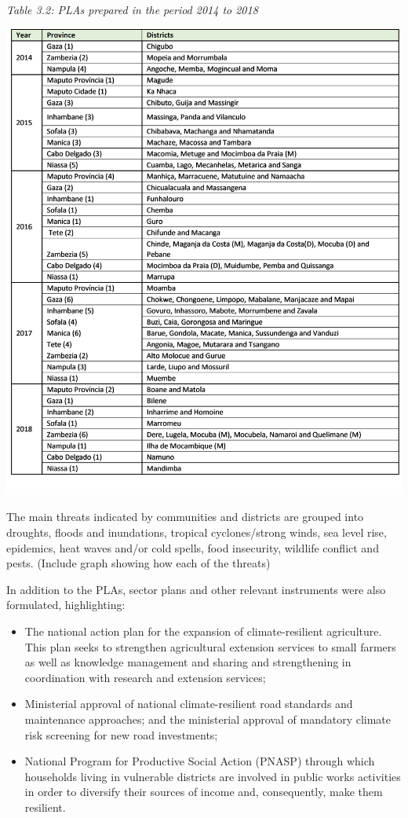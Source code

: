 \documentclass[
]{book}
\begin{document}
\emph{Table 3.2: PLAs prepared in the period 2014 to 2018}

\includegraphics{Figure25.png}

The main threats indicated by communities and districts are grouped into droughts, floods and inundations, tropical cyclones/strong winds, sea level rise, epidemics, heat waves and/or cold spells, food insecurity, wildlife conflict and pests. (Include graph showing how each of the threats)

In addition to the PLAs, sector plans and other relevant instruments were also formulated, highlighting:

\begin{itemize}
\item
  The national action plan for the expansion of climate-resilient agriculture. This plan seeks to strengthen agricultural extension services to small farmers as well as knowledge management and sharing and strengthening in coordination with research and extension services;
\item
  Ministerial approval of national climate-resilient road standards and maintenance approaches; and the ministerial approval of mandatory climate risk screening for new road investments;
\item
  National Program for Productive Social Action (PNASP) through which households living in vulnerable districts are involved in public works activities in order to diversify their sources of income and, consequently, make them resilient.
\end{itemize}
\end{document}
